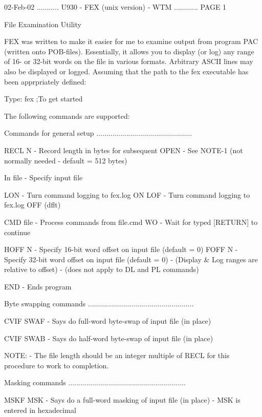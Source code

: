    02-Feb-02 ........... U930 - FEX (unix version) - WTM ............ PAGE   1
 
 
 
                            File Examination Utility
 
   FEX  was  written  to  make it easier for me to examine output from program
   PAC (written onto POB-files). Essentially, it allows  you  to  display  (or
   log)  any  range  of  16-  or  32-bit words on the file in various formats.
   Arbitrary ASCII lines may also be displayed or logged.  Assuming  that  the
   path to the fex executable has been apprpriately defined:
 
   Type:  fex        ;To get started
 
   The following commands are supported:
 
   Commands for general setup ................................................
 
   RECL N    - Record length in bytes for subsequent OPEN - See NOTE-1
               (not normally needed - default = 512 bytes)
 
   In  file  - Specify input file
 
   LON       - Turn command logging to fex.log ON
   LOF       - Turn command logging to fex.log OFF (dflt)
 
   CMD file  - Process commands from file.cmd
   WO        - Wait for typed [RETURN] to continue
 
   HOFF N    - Specify 16-bit word offset on input file (default = 0)
   FOFF N    - Specify 32-bit word offset on input file (default = 0)
             - (Display & Log ranges are relative to offset)
             - (does not apply to DL and PL commands)
 
   END       - Ends program
 
   Byte swapping commands .....................................................
 
   CVIF SWAF - Says do full-word byte-swap of input file (in place)
 
   CVIF SWAB - Says do half-word byte-swap of input file (in place)
 
   NOTE:     - The file length should be an integer multiple of RECL
               for this procedure to work to completion.
 
   Masking commands ...........................................................
 
   MSKF MSK  - Says do a full-word masking of input file (in place)
             - MSK is entered in hexadecimal
 
